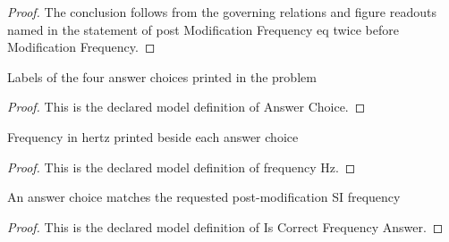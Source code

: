 \begin{proof}
  The conclusion follows from the governing relations and figure readouts named in the statement of post Modification Frequency eq twice before Modification Frequency.
\end{proof}
\begin{definition}
  \label{def:physics:phyx-mini-0210:phyxminiproblems-problemphyxmini0210-answerchoice}
  Labels of the four answer choices printed in the problem
\end{definition}
\begin{proof}
  This is the declared model definition of Answer Choice.
\end{proof}
\begin{definition}[frequency Hz]
  \label{def:physics:phyx-mini-0210:phyxminiproblems-problemphyxmini0210-answerchoice-frequencyhz}
  Frequency in hertz printed beside each answer choice
\end{definition}
\begin{proof}
  This is the declared model definition of frequency Hz.
\end{proof}
\begin{definition}
  \label{def:physics:phyx-mini-0210:phyxminiproblems-problemphyxmini0210-iscorrectfrequencyanswer}
  An answer choice matches the requested post-modification SI frequency
\end{definition}
\begin{proof}
  This is the declared model definition of Is Correct Frequency Answer.
\end{proof}

